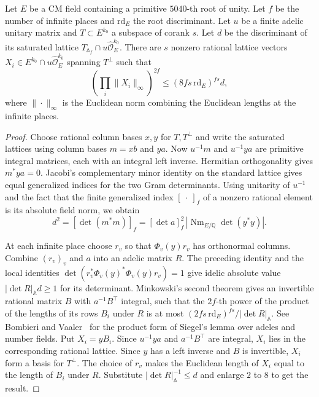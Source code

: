 \begin{lemma}
\label{lem:b-siegel-short-basis}
\emitthmsource
Let $E$ be a CM field containing a primitive $5040$-th root of unity. Let $f$ be the number of infinite places and $\mathrm{rd}_E$ the root discriminant.
Let $u$ be a finite adelic unitary matrix and $T\subset E^{k_0}$ a subspace of corank $s$. Let $d$ be the discriminant
of its saturated lattice $T_{\mathbb A_f}\cap u\widehat{\mathcal O}_E^{k_0}$. There are $s$ nonzero rational lattice vectors $X_i\in E^{k_0}\cap u\widehat{\mathcal O}_E^{k_0}$ spanning $T^\perp$ such that
\[
 \left(\prod_i\|X_i\|_\infty\right)^{2f}\le (8fs\,\mathrm{rd}_E)^{fs}d,
\]
where $\|\cdot\|_\infty$ is the Euclidean norm combining the Euclidean lengths at the infinite places.
\end{lemma}

\begin{proof}
Choose rational column bases $x,y$ for $T,T^\perp$ and write the saturated lattices using column bases $m=xb$ and $ya$.
Now $u^{-1}m$ and $u^{-1}ya$ are primitive integral matrices, each with an integral left inverse. Hermitian orthogonality gives $m^*ya=0$. Jacobi's complementary minor identity on the standard lattice gives equal generalized indices for the two Gram determinants. Using unitarity of $u^{-1}$ and the fact that the finite generalized index $[\ \cdot\ ]_f$ of a nonzero rational element is its absolute field norm, we obtain
\[
 d^2=[\det(m^*m)]_f=[\det a]_f^2\,|\operatorname{Nm}_{E/\mathbb Q}\det(y^*y)|.
\]

At each infinite place choose $r_v$ so that $\Phi_v(y)r_v$ has orthonormal columns. Combine $(r_v)_v$ and $a$ into an adelic matrix $R$. The preceding identity and the local identities $\det(r_v^*\Phi_v(y)^*\Phi_v(y)r_v)=1$ give idelic absolute value $|\det R|_{\mathbb A}d\ge 1$ for its determinant.
Minkowski's second theorem gives an invertible rational matrix $B$ with $a^{-1}B^\top$ integral, such that the $2f$-th power of the product of the lengths of its rows $B_i$ under $R$ is at most $(2fs\,\mathrm{rd}_E)^{fs}/|\det R|_{\mathbb A}$. See Bombieri and Vaaler~\cite{BombieriVaaler1983} for the product form of Siegel's lemma over adeles and number fields. Put $X_i=yB_i$. Since $u^{-1}ya$ and $a^{-1}B^\top$ are integral, $X_i$ lies in the corresponding rational lattice. Since $y$ has a left inverse and $B$ is invertible, $X_i$ form a basis for $T^\perp$. The choice of $r_v$ makes the Euclidean length of $X_i$ equal to the length of $B_i$ under $R$. Substitute $|\det R|_{\mathbb A}^{-1}\le d$ and enlarge $2$ to $8$ to get the result.
\end{proof}

